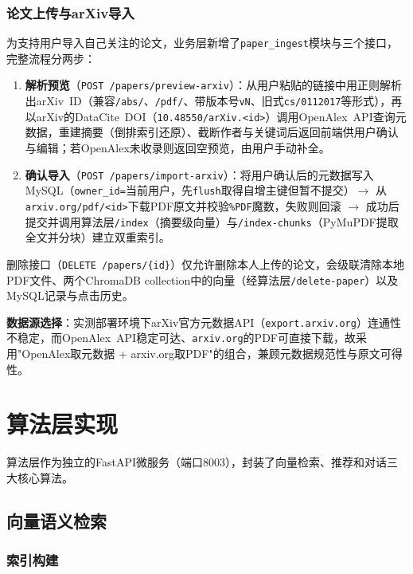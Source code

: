 \documentclass[12pt,a4paper]{ctexart}
\newcommand{\code}[1]{\texttt{#1}}
\newcommand{\api}[1]{\texttt{#1}}
\begin{document}
\subsubsection{论文上传与arXiv导入}

为支持用户导入自己关注的论文，业务层新增了\code{paper\_ingest}模块与三个接口，完整流程分两步：

\begin{enumerate}
\item \textbf{解析预览}（\api{POST /papers/preview-arxiv}）：从用户粘贴的链接中用正则解析出arXiv~ID（兼容\code{/abs/}、\code{/pdf/}、带版本号\code{vN}、旧式\code{cs/0112017}等形式），再以arXiv的DataCite~DOI（\code{10.48550/arXiv.<id>}）调用OpenAlex~API查询元数据，重建摘要（倒排索引还原）、截断作者与关键词后返回前端供用户确认与编辑；若OpenAlex未收录则返回空预览，由用户手动补全。
\item \textbf{确认导入}（\api{POST /papers/import-arxiv}）：将用户确认后的元数据写入MySQL（\code{owner\_id=}当前用户，先\code{flush}取得自增主键但暂不提交）$\to$ 从\code{arxiv.org/pdf/<id>}下载PDF原文并校验\code{\%PDF}魔数，失败则回滚 $\to$ 成功后提交并调用算法层\api{/index}（摘要级向量）与\api{/index-chunks}（PyMuPDF提取全文并分块）建立双重索引。
\end{enumerate}

删除接口（\api{DELETE /papers/\{id\}}）仅允许删除本人上传的论文，会级联清除本地PDF文件、两个ChromaDB collection中的向量（经算法层\api{/delete-paper}）以及MySQL记录与点击历史。

\textbf{数据源选择}：实测部署环境下arXiv官方元数据API（\code{export.arxiv.org}）连通性不稳定，而OpenAlex~API稳定可达、\code{arxiv.org}的PDF可直接下载，故采用"OpenAlex取元数据 + arxiv.org取PDF"的组合，兼顾元数据规范性与原文可得性。
\section{算法层实现}

算法层作为独立的FastAPI微服务（端口8003），封装了向量检索、推荐和对话三大核心算法。

\subsection{向量语义检索}

\subsubsection{索引构建}
\end{document}
